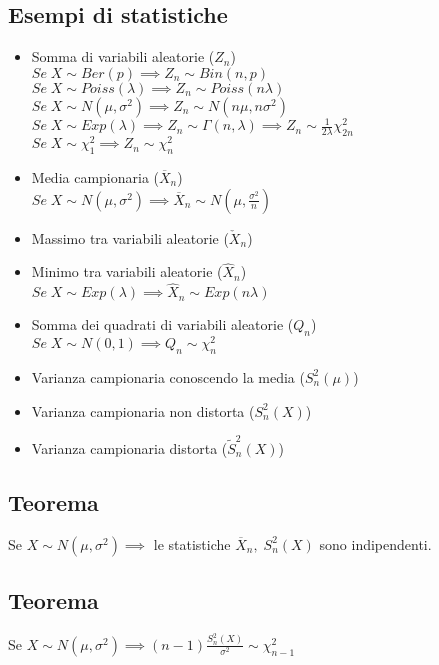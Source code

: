\documentclass{article}
\begin{document}
\subsection*{Esempi di statistiche}
\begin{itemize}
\item Somma di variabili aleatorie ($Z_{n}$)\\
$Se \; X \sim Ber(p) \implies Z_{n} \sim Bin(n,p)$\\
$Se \; X \sim Poiss(\lambda) \implies Z_{n} \sim Poiss(n \lambda)$\\
$Se \; X \sim N(\mu, \sigma^{2}) \implies Z_{n} \sim N(n\mu, n\sigma^{2})$\\
$Se \; X \sim Exp(\lambda) \implies Z_{n} \sim \Gamma(n, \lambda) \implies Z_{n} \sim \frac{1}{2\lambda}\chi_{2n}^{2}$\\
$Se \; X \sim \chi_{1}^{2} \implies Z_{n} \sim \chi_{n}^{2}$
\item Media campionaria ($\overline{X}_{n}$)\\
$Se \; X \sim N(\mu, \sigma^{2}) \implies \overline{X}_{n} \sim N(\mu, \frac{\sigma^{2}}{n})$
\item Massimo tra variabili aleatorie ($\check{X}_{n}$)
\item Minimo tra variabili aleatorie ($\hat{X}_{n}$)\\
$Se \; X \sim Exp(\lambda) \implies \hat{X}_{n} \sim Exp(n\lambda)$
\item Somma dei quadrati di variabili aleatorie ($Q_{n}$)\\
$Se \; X \sim N(0,1) \implies Q_{n} \sim \chi_{n}^{2}$
\item Varianza campionaria conoscendo la media ($S_{n}^{2}(\mu)$)
\item Varianza campionaria non distorta ($S_{n}^{2}(X)$)
\item Varianza campionaria distorta ($\widetilde{S}_{n}^{2}(X)$)
\end{itemize}

\subsection*{Teorema}
Se $X \sim N(\mu, \sigma^{2}) \implies$ le statistiche $\overline{X}_{n}, \; S_{n}^{2}(X)$ sono indipendenti.

\subsection*{Teorema}
Se $X \sim N(\mu, \sigma^{2}) \implies (n-1) \frac{S_{n}^{2}(X)}{\sigma^{2}} \sim \chi_{n-1}^{2}$
\end{document}
